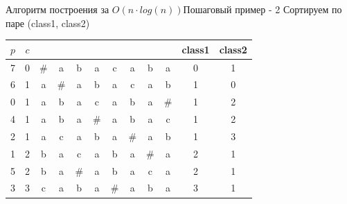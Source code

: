 \documentclass[10pt]{beamer}
\begin{document}
\begin{frame}[fragile]{Алгоритм построения за $O(n \cdot log(n))$}{Пошаговый пример - 2}
Сортируем по паре (class1, class2)\\
\begin{center}
\begin{tabular}{ c|c|cccccccc|c|c } 
 $p$ & $c$ & & & & & & & & & class1 & class2 \\ 
  \hline
 7 & 0 & \# & a & b & a & c & a & b & a & 0 & 1 \\ 
  \hline
 6 & 1 & a & \# & a & b & a & c & a & b & 1 & 0 \\ 
 \hline
 0 & 1 & a & b & a & c & a & b & a & \# & 1 & 2 \\ 
  \hline
 4 & 1 & a & b & a & \# & a & b & a & c & 1 & 2 \\ 
 \hline
 2 & 1 & a & c & a & b & a & \# & a & b & 1 & 3 \\ 
 \hline
 1 & 2 & b & a & c & a & b & a & \# & a & 2 & 1 \\ 
 \hline
 5 & 2 & b & a & \# & a & b & a & c & a & 2 & 1 \\ 
 \hline
 3 & 3 & c & a & b & a & \# & a & b & a & 3 & 1 \\ 
\end{tabular}
\end{center}
\end{frame}
\end{document}
